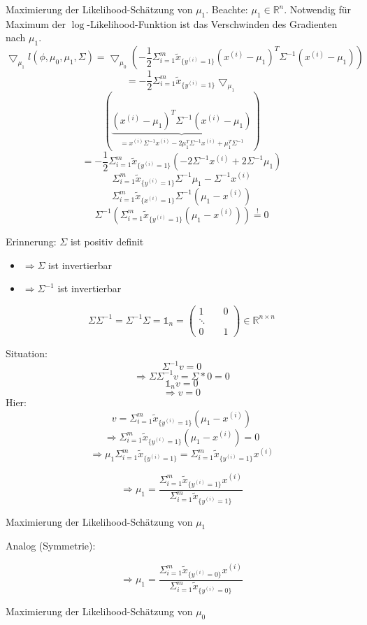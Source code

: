 Maximierung der Likelihood-Schätzung von $\mu_1$. Beachte: $\mu_1 \in \mathbb{R}^n$. Notwendig für Maximum der $\log$-Likelihood-Funktion ist das Verschwinden des Gradienten nach $\mu_1$.
\[\bigtriangledown_{\mu_1} l(\phi, \mu_0, \mu_1, \Sigma) = \bigtriangledown_{\mu_0} (- \frac{1}{2} \Sigma^m_{i=1} \tilde{x}_{\{y^{(i)} = 1\}} (x^{(i)}-\mu_1)^T \Sigma^{-1} (x^{(i)} - \mu_1))\]
\[= - \frac{1}{2} \Sigma^m_{i=1} \tilde{x}_{\{y^{(i)} = 1\}} \bigtriangledown_{\mu_1}\]
\[(\underbrace{(x^{(i)} - \mu_1)^T \Sigma^{-1} (x^{(i)} - \mu_1)}_{\substack{= x^{(i)} \Sigma^{-1} x^{(i)} -2\mu_1^T \Sigma^{-1} x^{(i)} + \mu_1^T \Sigma^{-1}}})\]
\[= - \frac{1}{2} \Sigma^m_{i=1} \tilde{x}_{\{y^{(i)} = 1\}} (-2 \Sigma^{-1} x^{(i)} + 2 \Sigma^{-1} \mu_1)\]
\[\Sigma^m_{i=1} \tilde{x}_{\{y^{(i)} = 1\}} \Sigma^{-1} \mu_1 - \Sigma^{-1} x^{(i)}\]
\[\Sigma^m_{i=1} \tilde{x}_{\{x^{(i)} = 1\}} \Sigma^{-1} (\mu_1 - x^{(i)})\]
\[\Sigma^{-1} (\Sigma^m_{i=1} \tilde{x}_{\{y^{(i)} = 1\}} (\mu_1 - x^{(i)})) \stackrel{!}{=} 0\]

\begin{framed}
Erinnerung: $\Sigma$ ist positiv definit
\begin{itemize}
\item $\Rightarrow \Sigma$ ist invertierbar
\item $\Rightarrow \Sigma^{-1}$ ist invertierbar 
\end{itemize}
\[\Sigma\Sigma^{-1} = \Sigma^{-1}\Sigma = \mathds{1}_n = \left( \begin{array}{ccc} 1 \quad\quad 0 \\ \ddots \\ 0 \quad\quad 1 \end{array}\right) \in \mathbb{R}^{n \times n}\]
\end{framed}
Situation:
\[\Sigma^{-1} v = 0\]
\[\Rightarrow \Sigma\Sigma^{-1} v = \Sigma * 0 = 0\]
\[\mathds{1}_n v = 0\]
\[\Rightarrow v = 0\]
Hier:
\[v = \Sigma^m_{i=1} \tilde{x}_{\{y^{(i)}= 1\}} (\mu_1 - x^{(i)})\]
\[\Rightarrow \Sigma^m_{i=1} \tilde{x}_{\{y^{(i)}=1\}} (\mu_1 - x^{(i)}) = 0\]
\[\Rightarrow \mu_1 \Sigma^m_{i=1} \tilde{x}_{\{ y^{(i)} = 1\}} = \Sigma^m_{i=1} \tilde{x}_{\{y^{(i)}=1\}} x^{(i)}\]
\begin{framed}
\[\Rightarrow \mu_1 = \frac{\Sigma^m_{i=1}\tilde{x}_{\{y^{(i)}=1\}} x^{(i)}}{\Sigma^m_{i=1}\tilde{x}_{\{y^{(i)}=1\}}}\]
\begin{center}
Maximierung der Likelihood-Schätzung von $\mu_1$
\end{center}
\end{framed}
Analog (Symmetrie):
\begin{framed}
\[\Rightarrow \mu_1 = \frac{\Sigma^m_{i=1}\tilde{x}_{\{y^{(i)}=0\}} x^{(i)}}{\Sigma^m_{i=1}\tilde{x}_{\{y^{(i)}=0\}}}\]
\begin{center}
Maximierung der Likelihood-Schätzung von $\mu_0$
\end{center}
\end{framed}


